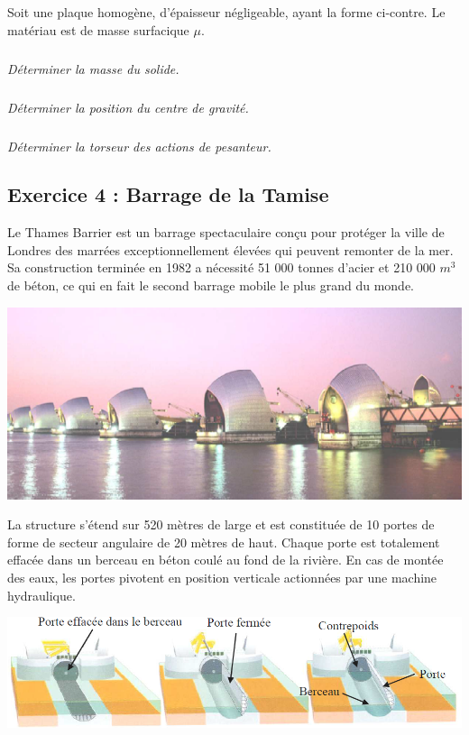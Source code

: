 \documentclass[10pt,fleqn]{article} %
\begin{document}
\begin{multicols}{2}
Soit une plaque homogène, d'épaisseur négligeable, ayant la forme ci-contre. Le matériau est de masse surfacique $\mu$.

\subparagraph{}
\textit{Déterminer la masse du solide.}

\subparagraph{}
\textit{Déterminer la position du centre de gravité.}

\subparagraph{}
\textit{Déterminer la torseur des actions de pesanteur.}


\subsection*{Exercice 4 : Barrage de la Tamise}
\setcounter{exo}{0}

Le Thames Barrier est un barrage spectaculaire conçu pour protéger la ville de Londres des marrées exceptionnellement élevées qui peuvent remonter de la mer. Sa construction terminée en 1982 a nécessité 51 000 tonnes d'acier et 210 000 $m^3$ de béton, ce qui en fait le second barrage mobile le plus grand du monde.



\begin{center}
\includegraphics[width=.9\linewidth]{images/fig1}
\end{center}


La structure s'étend sur 520 mètres de large et est constituée de 10 portes de forme de secteur angulaire de 20 mètres de haut. Chaque porte est totalement effacée dans un berceau en béton coulé au fond de la rivière. En cas de montée des eaux, les portes pivotent en position verticale actionnées par une machine hydraulique.

\begin{center}
\includegraphics[width=.9\linewidth]{images/fig2}
\end{center}





\end{multicols}
\end{document}
